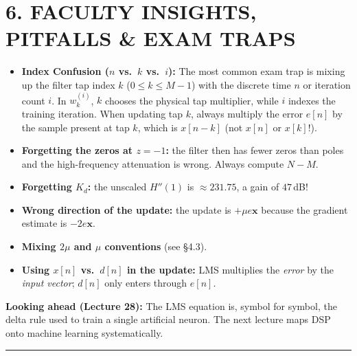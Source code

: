 \documentclass[11pt,a4paper]{article}
\begin{document}
\section{6. FACULTY INSIGHTS, PITFALLS \& EXAM TRAPS}
\begin{itemize}
    \item \textbf{Index Confusion ($n$ vs.\ $k$ vs.\ $i$):} The most common exam trap is mixing up the filter tap index $k$ ($0 \le k \le M-1$) with the discrete time $n$ or iteration count $i$. In $w_k^{(i)}$, $k$ chooses the physical tap multiplier, while $i$ indexes the training iteration. When updating tap $k$, always multiply the error $e[n]$ by the sample present at tap $k$, which is $x[n-k]$ (not $x[n]$ or $x[k]$!).
    \item \textbf{Forgetting the zeros at $z=-1$:} the filter then has fewer zeros than poles and the high-frequency attenuation is wrong. Always compute $N-M$.
    \item \textbf{Forgetting $K_d$:} the unscaled $H''(1)$ is $\approx 231.75$, a gain of $47$\,dB!
    \item \textbf{Wrong direction of the update:} the update is $+\mu e\mathbf{x}$ because the gradient estimate is $-2e\mathbf{x}$.
    \item \textbf{Mixing $2\mu$ and $\mu$ conventions} (see \S 4.3).
    \item \textbf{Using $x[n]$ vs.\ $d[n]$ in the update:} LMS multiplies the \emph{error} by the \emph{input vector}; $d[n]$ only enters through $e[n]$.
\end{itemize}

\vspace{2mm}
\noindent\textbf{Looking ahead (Lecture 28):} The LMS equation is, symbol for symbol, the delta rule used to train a single artificial neuron. The next lecture maps DSP onto machine learning systematically.

\noindent\rule{\textwidth}{0.5pt}
\end{document}
